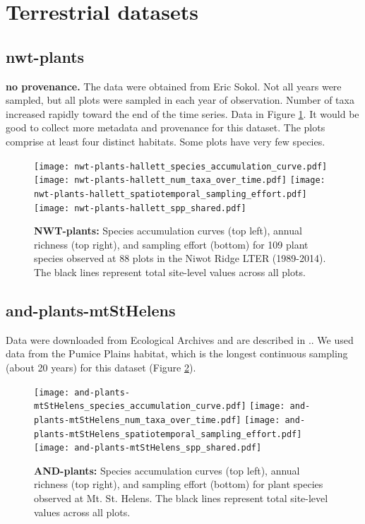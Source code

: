 \documentclass[11pt, oneside]{article}
\begin{document}
\section {Terrestrial datasets}

\subsection {nwt-plants}
{\bf no provenance.}
The data were obtained from Eric Sokol.
Not all years were sampled, but all plots were sampled in each year of observation. 
 Number of taxa increased rapidly toward the end of the time series. 
 Data in Figure \ref{nwt-plants}.
 It would be good to collect more metadata and provenance for this dataset.
 The plots comprise at least four distinct habitats.
 Some plots have very few species.

\begin{figure}[h!]
\centering
\texttt{[image: nwt-plants-hallett\_species\_accumulation\_curve.pdf]}
\texttt{[image: nwt-plants-hallett\_num\_taxa\_over\_time.pdf]}
\texttt{[image: nwt-plants-hallett\_spatiotemporal\_sampling\_effort.pdf]}
\texttt{[image: nwt-plants-hallett\_spp\_shared.pdf]}
\caption{{\bf NWT-plants:} Species accumulation curves (top left),  annual richness (top right), and sampling effort (bottom)  for 109 plant species observed at 88 plots in the Niwot Ridge LTER (1989-2014). The black lines represent total site-level values across all plots.}
\label{nwt-plants}
\end{figure}


\subsection {and-plants-mtStHelens}
Data were downloaded from Ecological Archives \citep{and-plants} and are described in \citep{delMoral2005}..
We used data from the Pumice Plains habitat, which is the longest continuous sampling (about 20 years) for this dataset (Figure \ref{and-plants}).

\begin{figure}[h!]
\centering
\texttt{[image: and-plants-mtStHelens\_species\_accumulation\_curve.pdf]}
\texttt{[image: and-plants-mtStHelens\_num\_taxa\_over\_time.pdf]}
\texttt{[image: and-plants-mtStHelens\_spatiotemporal\_sampling\_effort.pdf]}
\texttt{[image: and-plants-mtStHelens\_spp\_shared.pdf]}
\caption{{\bf AND-plants:} Species accumulation curves (top left),  annual richness (top right), and sampling effort (bottom)  for plant species observed at Mt. St. Helens. The black lines represent total site-level values across all plots.}
\label{and-plants}
\end{figure}
\end{document}

